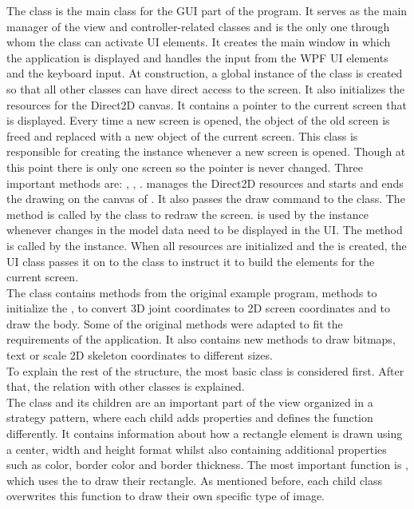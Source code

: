 The  class is the main class for the GUI part of the program. It serves as the main manager of the view and controller-related classes and is the only one through whom the  class can activate UI elements. It creates the main window in which the application is displayed and handles the input from the WPF UI elements and the keyboard input. At construction, a global instance of the  class is created so that all other classes can have direct access to the screen. It also initializes the resources for the Direct2D canvas. It contains a pointer to the current screen that is displayed. Every time a new screen is opened, the object of the old screen is freed and replaced with a new object of the current screen. This class is responsible for creating the instance whenever a new screen is opened. Though at this point there is only one screen so the pointer is never changed. Three important methods are:  , , .  manages the Direct2D resources and starts and ends the drawing on the canvas of . It also passes the draw command to the  class. The method is called by the  class to redraw the screen.  is used by the  instance whenever changes in the model data need to be displayed in the UI. The  method is called by the  instance. When all resources are initialized and the  is created, the UI class passes it on to the  class to instruct it to build the elements for the current screen.\\

The  class contains methods from the original example program, methods to initialize the , to convert 3D joint coordinates to 2D screen coordinates and to draw the body. Some of the original methods were adapted to fit the requirements of the application. It also contains new methods to draw bitmaps, text or scale 2D skeleton coordinates to different sizes.\\

To explain the rest of the structure, the most basic class is considered first. After that, the relation with other classes is explained.\\

The  class and its children are an important part of the view organized in a strategy pattern, where each child adds properties and defines the  function differently. It contains information about how a rectangle element is drawn using a center, width and height format whilst also containing additional properties such as color, border color and border thickness. The most important function is , which uses the  to draw their rectangle. As mentioned before, each child class overwrites this function to draw their own specific type of image.\\

